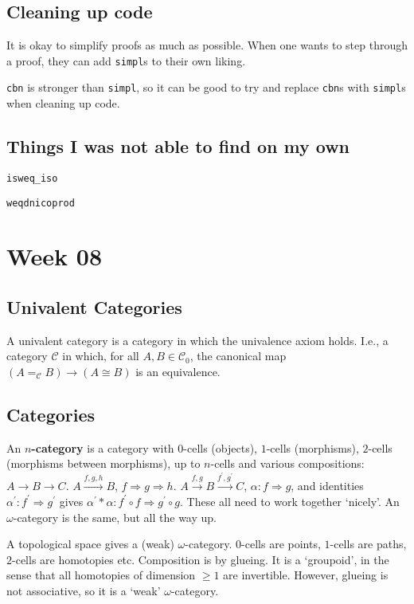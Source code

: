 \documentclass{amsbook}
\newcommand{\Catc}[1]{\mathcal{#1}}
\newcommand{\CC}{\Catc{C}}
\newcommand{\Ob}[1]{{#1}_0}
\begin{document}
  \section{Cleaning up code}
  It is okay to simplify proofs as much as possible. When one wants to step through a proof, they can add \texttt{simpl}s to their own liking.

  \texttt{cbn} is stronger than \texttt{simpl}, so it can be good to try and replace \texttt{cbn}s with \texttt{simpl}s when cleaning up code.

  \section{Things I was not able to find on my own}
  \texttt{isweq\_iso}

  \texttt{weqdnicoprod}

  \chapter{Week 08}
  \section{Univalent Categories}
  A univalent category is a category in which the univalence axiom holds. I.e., a category $ \mathcal C $ in which, for all $ A, B \in \Ob \CC $, the canonical map $ (A =_{\mathcal C} B) \to (A \cong B) $ is an equivalence.

  \section{Categories}
  An \textbf{$ n $-category} is a category with $ 0 $-cells (objects), $ 1 $-cells (morphisms), $ 2 $-cells (morphisms between morphisms), up to $ n $-cells and various compositions: $ A \to B \to C $. $ A \xrightarrow{f, g, h} B $, $ f \Rightarrow g \Rightarrow h $. $ A \xrightarrow{f, g} B \xrightarrow{f^\prime, g^\prime} C $, $ \alpha: f \Rightarrow g $, and identities $ \alpha^\prime: f^\prime \Rightarrow g^\prime $ gives $ \alpha^\prime * \alpha: f^\prime \circ f \Rightarrow g^\prime \circ g $. These all need to work together `nicely'. An $ \omega $-category is the same, but all the way up.

  A topological space gives a (weak) $ \omega $-category. $ 0 $-cells are points, $ 1 $-cells are paths, $ 2 $-cells are homotopies etc. Composition is by glueing. It is a `groupoid', in the sense that all homotopies of dimension $ \geq 1 $ are invertible. However, glueing is not associative, so it is a `weak' $ \omega $-category.
\end{document}

